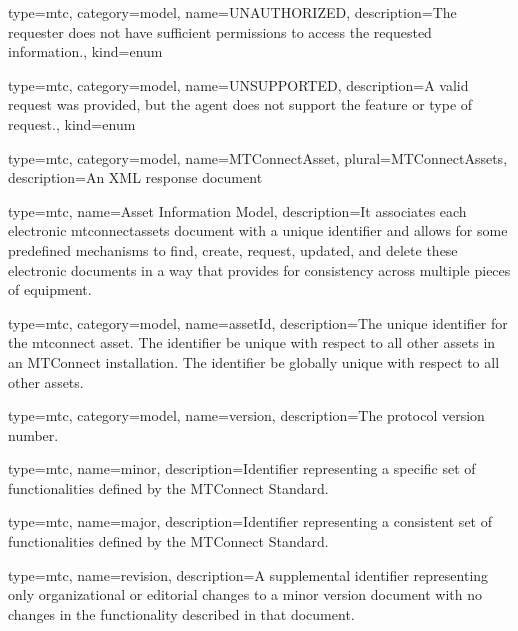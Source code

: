 {
  type=mtc,
  category=model,
  name={UNAUTHORIZED},
  description={The \gls{requester} does not have sufficient permissions to access the requested information.},
  kind={enum}
}

{
  type=mtc,
  category=model,
  name={UNSUPPORTED},
  description={A valid \gls{request} was provided, but the \gls{agent} does not support the feature or type of \gls{request}.},
  kind={enum}
}













{
  type=mtc,
  category=model,
  name={MTConnectAsset},
  plural={MTConnectAssets},
  description={An XML response document}
}


{
  type=mtc,
  name={Asset Information Model},
  description={It associates each electronic \glspl{mtconnectasset} document with a unique identifier and allows for some predefined mechanisms to find, create, request, updated, and delete these electronic documents in a way that provides for consistency across multiple pieces of equipment.}
}


{
  type=mtc,
  category=model,
  name={assetId},
  description={The unique identifier for the \gls{mtconnect asset}. The identifier \MUST be unique with respect to all other \glspl{asset} in an MTConnect installation. The identifier \SHOULD be globally unique with respect to all other \glspl{asset}.}
}


{
  type=mtc,
  category=model,
  name={version},
  description={The protocol version number.}
}

{
  type=mtc,
  name={minor},
  description={Identifier representing a specific set of functionalities defined by the MTConnect Standard.}
}



{
  type=mtc,
  name={major},
  description={Identifier representing a consistent set of functionalities defined by the MTConnect Standard. }
}

{
  type=mtc,
  name={revision},
  description={A supplemental identifier representing only organizational or editorial changes to a \gls{minor} version document with no changes in the functionality described in that document.}
}




